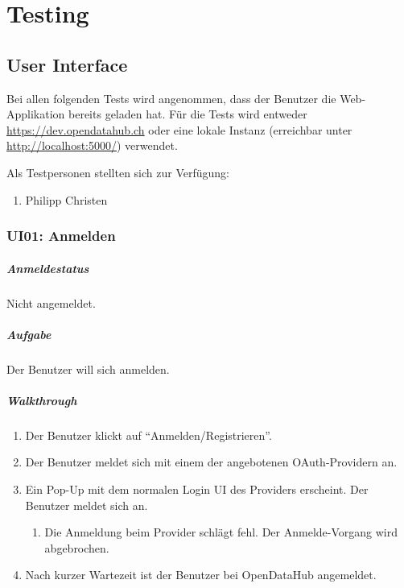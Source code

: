 \chapter{Testing}
\section{User Interface}

Bei allen folgenden Tests wird angenommen, dass der Benutzer die Web-Applikation bereits geladen hat. Für die Tests wird entweder \url{https://dev.opendatahub.ch} oder eine lokale Instanz (erreichbar unter \url{http://localhost:5000/}) verwendet.

Als Testpersonen stellten sich zur Verfügung:
\begin{enumerate}
\item Philipp Christen
\end{enumerate}

\subsection{UI01: Anmelden}
\paragraph{Anmeldestatus} Nicht angemeldet.

\paragraph{Aufgabe} Der Benutzer will sich anmelden.

\paragraph{Walkthrough}
\begin{enumerate}
\item Der Benutzer klickt auf ``Anmelden/Registrieren''.
\item Der Benutzer meldet sich mit einem der angebotenen OAuth-Providern an.
\item Ein Pop-Up mit dem normalen Login UI des Providers erscheint. Der Benutzer meldet sich an.
  \begin{enumerate}[label=\labelenumi\alph*.]
  \item Die Anmeldung beim Provider schlägt fehl. Der Anmelde-Vorgang wird abgebrochen.
  \end{enumerate}
\item Nach kurzer Wartezeit ist der Benutzer bei OpenDataHub angemeldet.
\end{enumerate}

